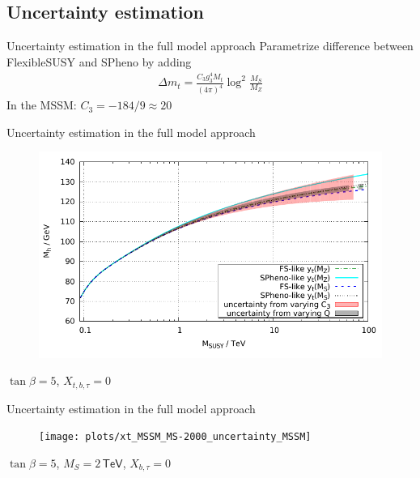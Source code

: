 \documentclass[hyperref={pdfpagelabels=false},ngerman]{beamer}
\newcommand{\eh}[1]{\,\mathsf{#1}}
\begin{document}


\subsection{Uncertainty estimation}

\begin{frame}{Uncertainty estimation in the full model approach}
  Parametrize difference between FlexibleSUSY and SPheno by adding
  \begin{align*}
    \Delta m_t = \frac{C_3 g_3^4 M_t}{(4\pi)^4} \log^2\frac{M_S}{M_Z}
  \end{align*}
  In the MSSM: $C_3 = -184/9 \approx 20$
\end{frame}

\begin{frame}{Uncertainty estimation in the full model approach}
  \begin{figure}
    \centering
    \includegraphics[width=\textwidth]{plots/scale_MSSM_yt_variants}
  \end{figure}
  $\tan\beta = 5$, $X_{t,b,\tau} = 0$
\end{frame}

\begin{frame}{Uncertainty estimation in the full model approach}
  \begin{figure}
    \centering
    \texttt{[image: plots/xt\_MSSM\_MS-2000\_uncertainty\_MSSM]}
  \end{figure}
  $\tan\beta = 5$, $M_S = 2\eh{TeV}$, $X_{b,\tau} = 0$
\end{frame}
\end{document}
